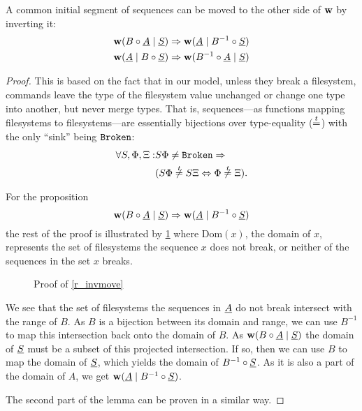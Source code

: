 \begin{mylem}\label{r_invmove}
A common initial segment of sequences can be moved to the other side of $\mathbf{w}$ by inverting it:
\begin{gather*}
\mathbf{w}({B\circ \underline{A}}\mathrel{|}{\underline{S}}) \Rightarrow \mathbf{w}({\underline{A}}\mathrel{|}{B^{-1}\circ \underline{S}}) \\
\mathbf{w}({\underline{A}}\mathrel{|}{B\circ \underline{S}}) \Rightarrow \mathbf{w}({B^{-1}\circ \underline{A}}\mathrel{|}{\underline{S}})
\end{gather*}
\end{mylem}
\begin{proof}
This is based on the fact that in our model, unless they break a filesystem,
commands leave the type of the filesystem value unchanged 
or change one type into another, but never merge types.
That is,
sequences---as functions mapping filesystems to filesystems---are
essentially bijections over type-equality ($\stackrel{t}{=}$)
with the only ``sink'' being $\mathtt{Broken}$:
\begin{align*}
\forall S,\FS,\GS: &S\FS\neq\fsbroken \Rightarrow \\
&(S\FS\ntypeeq S\GS \Leftrightarrow \FS\ntypeeq \GS).
\end{align*}

For the proposition
\[ \mathbf{w}({B\circ \underline{A}}\mathrel{|}{\underline{S}}) \Rightarrow \mathbf{w}({\underline{A}}\mathrel{|}{B^{-1}\circ \underline{S}}) \]
the rest of the proof is illustrated by \cref{fig_invmove}
where $\textrm{Dom}(x)$, the domain of $x$, represents the set of filesystems
the sequence $x$ does not break, or neither of the sequences in the set $x$ breaks.

\begin{figure}[htb]

\caption{Proof of \cref{r_invmove}}\label{fig_invmove}
\end{figure}

We see that the set of filesystems the sequences in $\underline{A}$ do not break intersect with the range of $B$.
As $B$ is a bijection between its domain and range, we can use $B^{-1}$ to map this intersection back
onto the domain of $B$.
As $\mathbf{w}({B\circ \underline{A}}\mathrel{|}{\underline{S}})$ the domain of $\underline{S}$ must be a subset of this
projected intersection.
If so, then we can use $B$ to map the domain of $\underline{S}$, which yields the domain of $B^{-1}\circ \underline{S}$.
As it is also a part of the domain of $A$, we get $\mathbf{w}({\underline{A}}\mathrel{|}{B^{-1}\circ \underline{S}})$.

The second part of the lemma can be proven in a similar way.
\end{proof}


